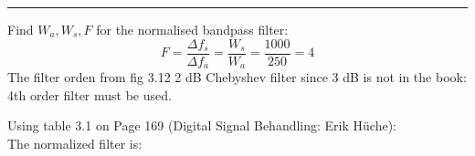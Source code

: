 \rule{\textwidth}{0.5pt}

Find $W_a, W_s, F$ for the normalised bandpass filter:
$$F=\frac{\Delta f_{s}}{\Delta f_{a}}=\frac{W_{s}}{W_{a}}=\frac{1000}{250}=4$$
The filter orden from fig 3.12 2 dB Chebyshev filter since 3 dB is not in the book:\\
4th order filter must be used.

Using table 3.1 on Page 169 (Digital Signal Behandling: Erik Hüche):\\
The normalized filter is:
